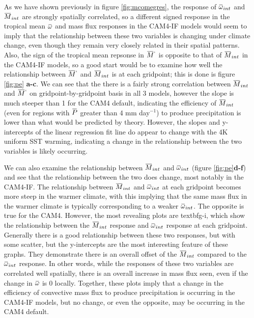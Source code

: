 \documentclass[letterpaper,12pt,titlepage,oneside,final]{book}
\newcommand{\overbar}[1]{\mkern 1.5mu\overline{\mkern-1.5mu#1\mkern-1.5mu}\mkern 1.5mu}
\begin{document}
As we have shown previously in figure \ref{fig:mcomegres}, the response of $\overbar{\omega}_{int}$ and $\overbar{M}_{int}$ are strongly spatially correlated, so a different signed response in the tropical mean $\overbar{\omega}$ and mass flux responses in the CAM4-IF models would seem to imply that the relationship between these two variables is changing under climate change, even though they remain very closely related in their spatial patterns. Also, the sign of the tropical mean repsonse in $\overbar{M}^{`}$ is opposite to that of $\overbar{M}_{int}$ in the CAM4-IF models, so a good start would be to examine how well the relationship between $\overbar{M}^{`}$ and $\overbar{M}_{int}$ is at each gridpoint; this is done is figure \ref{fig:pe} \textbf{a-c}. We can see that the there is a fairly strong correlation between $\overbar{M}_{int}$ and $\overbar{M}^{`}$  on gridpoint-by-gridpoint basis in all 3 models, however the slope is much steeper than 1 for the CAM4 default, indicating the efficiency of $\overbar{M}_{int}$ (even for regions with $\overbar{P}$ greater than 4 mm day$^{-1}$) to produce precipitation is lower than what would be predicted by theory. However, the slopes and y-intercepts of the linear regression fit line do appear to change with the 4K uniform SST warming, indicating a change in the relationship between the two variables is likely occurring. 

We can also examine the relationship between $\overbar{M}_{int}$ and $\overbar{\omega}_{int}$ (figure \ref{fig:pe}\textbf{d-f}) and see that the relationship between the two does change, most notably in the CAM4-IF. The relationship between $\overbar{M}_{int}$ and $\overbar{\omega}_{int}$  at each gridpoint becomes more steep in the warmer climate, with this implying that the same mass flux in the warmer climate is typically corresponding to a weaker $\overbar{\omega}_{int}$. The opposite is true for the CAM4. However, the most revealing plots are textbf{g-i}, which show the relationship between the $\overbar{M}_{int}$ response and $\overbar{\omega}_{int}$ response at each gridpoint. Generally there is a good relationship between these two responses, but with some scatter, but the y-intercepts are the most interesting feature of these graphs. They demonstrate there is an overall offset of the $\overbar{M}_{int}$ compared to the $\overbar{\omega}_{int}$ response. In other words, while the responses of these two variables are correlated well spatially, there is an overall increase in mass flux seen, even if the change in $\overbar{\omega}$ is 0 locally. Together, these plots imply that a change in the efficiency of convective mass flux to produce precipitation is occurring in the CAM4-IF models, but no change, or even the opposite, may be occurring in the CAM4 default.
\end{document}
